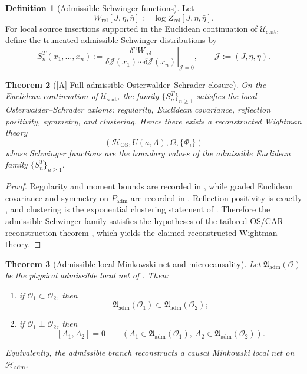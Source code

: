 \documentclass[11pt,a4paper]{article}
\newtheorem{theorem}{Theorem}[section]
\theoremstyle{definition}
\newtheorem{definition}[theorem]{Definition}
\theoremstyle{remark}
\newcommand{\Padm}{P_{\mathrm{adm}}}
\begin{document}
\begin{definition}[Admissible Schwinger functions]
\label{def:admissible-schwinger-functions}
Let
\[
W_{\mathrm{rel}}[J,\eta,\bar\eta]:=\log Z_{\mathrm{rel}}[J,\eta,\bar\eta].
\]
For local source insertions supported in the Euclidean continuation of
$\mathcal U_{\mathrm{scat}}$, define the truncated admissible Schwinger distributions by
\[
S_n^T(x_1,\ldots,x_n)
:=
\left.
\frac{\delta^n W_{\mathrm{rel}}}{\delta\mathcal J(x_1)\cdots\delta\mathcal J(x_n)}
\right|_{\mathcal J=0},
\qquad
\mathcal J:=(J,\eta,\bar\eta).
\]
\end{definition}

\begin{theorem}[\textnormal{[A]} Full admissible Osterwalder--Schrader closure]
\label{thm:full-admissible-os-closure}
On the Euclidean continuation of $\mathcal U_{\mathrm{scat}}$, the family
$\{S_n^T\}_{n\ge 1}$ satisfies the local Osterwalder--Schrader axioms: regularity, Euclidean
covariance, reflection positivity, symmetry, and clustering. Hence there exists a reconstructed
Wightman theory
\[
(\mathcal H_{\mathrm{OS}},U(a,\Lambda),\Omega,\{\Phi_i\})
\]
whose Schwinger functions are the boundary values of the admissible Euclidean family
$\{S_n^T\}_{n\ge 1}$.
\end{theorem}

\begin{proof}
Regularity and moment bounds are recorded in
, while graded Euclidean covariance and symmetry on $\Padm$ are
recorded in . Reflection positivity is exactly
, and clustering is the exponential clustering statement
of . Therefore the admissible Schwinger family satisfies
the hypotheses of the tailored OS/CAR reconstruction theorem
, which yields the claimed reconstructed Wightman theory.
\end{proof}

\begin{theorem}[Admissible local Minkowski net and microcausality]
\label{thm:admissible-local-minkowski-net}
Let $\mathfrak A_{\mathrm{adm}}(\mathcal O)$ be the physical admissible local net of
. Then:
\begin{enumerate}[label=\textup{(\roman*)}, leftmargin=1.8em, topsep=3pt, itemsep=2pt]
    \item if $\mathcal O_1\subset\mathcal O_2$, then
    \[
    \mathfrak A_{\mathrm{adm}}(\mathcal O_1)\subset \mathfrak A_{\mathrm{adm}}(\mathcal O_2);
    \]
    \item if $\mathcal O_1\perp\mathcal O_2$, then
    \[
    [A_1,A_2]=0
    \qquad
    (A_1\in\mathfrak A_{\mathrm{adm}}(\mathcal O_1),\ A_2\in\mathfrak A_{\mathrm{adm}}(\mathcal O_2)).
    \]
\end{enumerate}
Equivalently, the admissible branch reconstructs a causal Minkowski local net on
$\mathcal H_{\mathrm{adm}}$.
\end{theorem}
\end{document}

